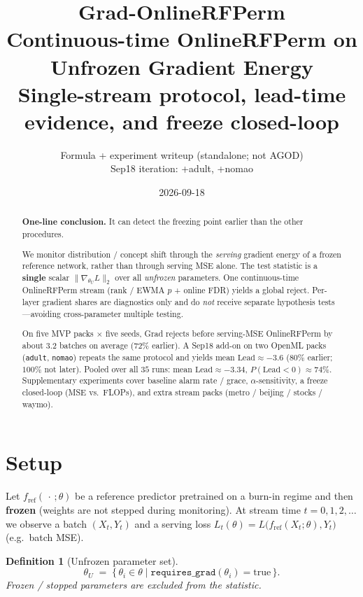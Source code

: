 \documentclass[11pt]{article}
\title{\textbf{Grad-OnlineRFPerm}\\[0.35em]
\large Continuous-time OnlineRFPerm on Unfrozen Gradient Energy\\[0.15em]
\large Single-stream protocol, lead-time evidence, and freeze closed-loop}
\author{Formula + experiment writeup \quad (standalone; not AGOD)\\
Sep18 iteration: +adult, +nomao}
\date{2026-09-18}
\newtheorem{definition}{Definition}
\newcommand{\Lead}{\mathrm{Lead}}
\newcommand{\gradU}{\nabla_{\theta_U}}
\begin{document}
\maketitle

\begin{abstract}
\textbf{One-line conclusion.}
It can detect the freezing point earlier than the other procedures.

We monitor distribution / concept shift through the \emph{serving}
gradient energy of a frozen reference network, rather than through
serving MSE alone. The test statistic is a \textbf{single} scalar
$\| \gradU L \|_2$ over all \emph{unfrozen} parameters.
One continuous-time OnlineRFPerm stream (rank / EWMA $p$ + online FDR)
yields a global reject. Per-layer gradient shares are diagnostics only
and do \emph{not} receive separate hypothesis tests---avoiding
cross-parameter multiple testing.

On five MVP packs $\times$ five seeds, Grad rejects before
serving-MSE OnlineRFPerm by about $3.2$ batches on average
($72\%$ earlier). A Sep18 add-on on two OpenML packs
(\texttt{adult}, \texttt{nomao}) repeats the same protocol and
yields mean $\Lead\approx -3.6$ ($80\%$ earlier; $100\%$ not later).
Pooled over all $35$ runs: mean $\Lead\approx -3.34$,
$P(\Lead<0)\approx 74\%$. Supplementary experiments cover baseline
alarm rate / grace, $\alpha$-sensitivity, a freeze closed-loop
(MSE vs.\ FLOPs), and extra stream packs (metro / beijing / stocks / waymo).
\end{abstract}

\tableofcontents
\vspace{1em}

\section{Setup}
\label{sec:setup}

Let $f_{\mathrm{ref}}(\,\cdot\,;\theta)$ be a reference predictor
pretrained on a burn-in regime and then \textbf{frozen}
(weights are not stepped during monitoring).
At stream time $t=0,1,2,\ldots$ we observe a batch
$(X_t,Y_t)$ and a serving loss
$L_t(\theta)=L\bigl(f_{\mathrm{ref}}(X_t;\theta),Y_t\bigr)$
(e.g.\ batch MSE).

\begin{definition}[Unfrozen parameter set]
\begin{equation}
  \theta_U
  \;=\;
  \bigl\{\,
    \theta_i \in \theta
    \;\big|\;
    \texttt{requires\_grad}(\theta_i)=\mathrm{true}
  \,\bigr\}.
\end{equation}
Frozen / stopped parameters are excluded from the statistic.
\end{definition}
\end{document}
